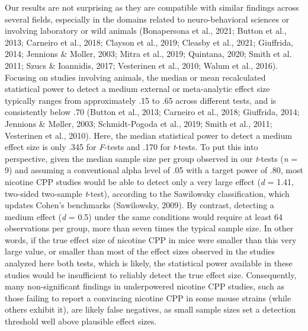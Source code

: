 \documentclass[authordate, meta, issue]{jote-new-article}
\begin{document}
	Our results are not surprising as they are compatible with similar findings across several fields, especially in the domains related to neuro-behavioral sciences or involving laboratory or wild animals (Bonapersona et al., 2021; Button et al., 2013; Carneiro et al., 2018; Clayson et al., 2019; Cleasby et al., 2021; Giuffrida, 2014; Jennions \& Moller, 2003; Mitra et al., 2019; Quintana, 2020; Smith et al. 2011; Szucs \& Ioannidis, 2017; Vesterinen et al., 2010; Walum et al., 2016). Focusing on studies involving animals, the median or mean recalculated statistical power to detect a medium external or meta-analytic effect size typically ranges from approximately .15 to .65 across different tests, and is consistently below .70 (Button et al., 2013; Carneiro et al., 2018; Giuffrida, 2014; Jennions \& Møller, 2003; Schmidt-Pogoda et al., 2019; Smith et al., 2011; Vesterinen et al., 2010). Here, the median statistical power to detect a medium effect size is only .345 for \emph{F}-tests and .170 for \emph{t}-tests. To put this into perspective, given the median sample size per group observed in our \emph{t}-tests (\emph{n} = 9) and assuming a conventional alpha level of .05 with a target power of .80, most nicotine CPP studies would be able to detect only a very large effect (\emph{d} = 1.41, two-sided two-sample \emph{t}-test), according to the Sawilowsky classification, which updates Cohen's benchmarks (Sawilowsky, 2009). By contrast, detecting a medium effect (\emph{d} = 0.5) under the same conditions would require at least 64 observations per group, more than seven times the typical sample size. In other words, if the true effect size of nicotine CPP in mice were smaller than this very large value, or smaller than most of the effect sizes observed in the studies analyzed here both tests, which is likely, the statistical power available in these studies would be insufficient to reliably detect the true effect size. Consequently, many non-significant findings in underpowered nicotine CPP studies, such as those failing to report a convincing nicotine CPP in some mouse strains (while others exhibit it), are likely false negatives, as small sample sizes set a detection threshold well above plausible effect sizes.
\end{document}
